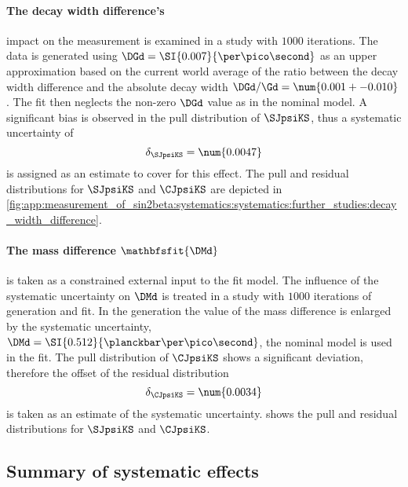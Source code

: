 \paragraph{The \Bdbfsf decay width difference's} impact on the \CP measurement
is examined in a \ToyMC study with $\num{1000}$ iterations. The data is
generated using $\DGd = \SI{0.007}{\per\pico\second}$ as an upper approximation
based on the current world average of the ratio between the decay width
difference and the absolute decay width $\DGd/\Gd = \num{0.001 +- 0.010}$
\cite{Amhis:2014hma}. The fit then neglects the non-zero $\DGd$ value as in the
nominal model. A significant bias is observed in the pull distribution of
$\SJpsiKS$, thus a systematic uncertainty of
%
\begin{equation}
  \delta_{\SJpsiKS} = \num{0.0047}
\end{equation}
%
is assigned as an estimate to cover for this effect. The pull and residual
distributions for $\SJpsiKS$ and $\CJpsiKS$ are depicted in
\cref{fig:app:measurement_of_sin2beta:systematics:systematics:further_studies:decay_width_difference}.

\paragraph{The \Bdbfsf mass difference $\mathbfsfit{\DMd}$} is taken as a
constrained external input to the fit model. The influence of the systematic
uncertainty on $\DMd$ is treated in a \ToyMC study with $\num{1000}$ iterations
of generation and fit. In the generation the value of the mass difference is
enlarged by the systematic uncertainty, \ie $\DMd =
\SI{0.512}{\planckbar\per\pico\second}$, the nominal model is used in the fit.
The pull distribution of $\CJpsiKS$ shows a significant deviation, therefore the
offset of the residual distribution
%
\begin{equation}
  \delta_{\CJpsiKS} = \num{0.0034}
\end{equation}
%
is taken as an estimate of the systematic uncertainty.
shows the pull and residual distributions for $\SJpsiKS$ and $\CJpsiKS$.

\subsection{Summary of systematic effects}
\label{sec:measurement_of_sin2beta:systematics:summary}

